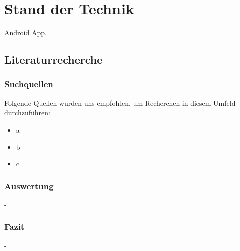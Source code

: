 \section{Stand der Technik}
Android App.

\subsection{Literaturrecherche}
\subsubsection{Suchquellen}
Folgende Quellen wurden uns empfohlen, um Recherchen in diesem Umfeld durchzuführen:
\begin{itemize}
	\item a
    \item b
    \item c
\end{itemize}

\subsubsection{Auswertung}
-

\subsubsection{Fazit}
-